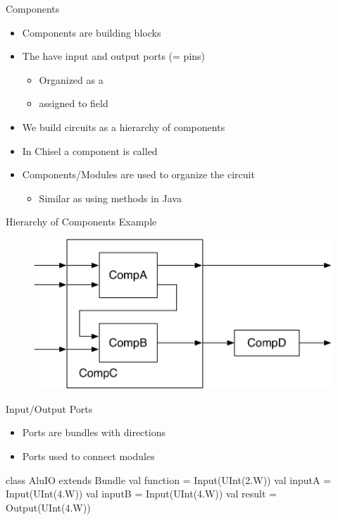 \begin{frame}[fragile]{Components}
\begin{itemize}
\item Components are building blocks
\item The have input and output ports (= pins)
\begin{itemize}
\item Organized as a 
\item assigned to field 
\end{itemize}
\item We build circuits as a hierarchy of components
\item In Chisel a component is called 
\item Components/Modules are used to organize the circuit
\begin{itemize}
\item Similar as using methods in Java
\end{itemize}
\end{itemize}
\end{frame}

\begin{frame}[fragile]{Hierarchy of Components Example}
\begin{figure}
  \includegraphics[scale=\scale]{../figures/components}
\end{figure}
\end{frame}


\begin{frame}[fragile]{Input/Output Ports}
\begin{itemize}
\item Ports are bundles with directions
\item Ports used to connect modules
\end{itemize}
\begin{chisel}
class AluIO extends Bundle {
  val function = Input(UInt(2.W))
  val inputA = Input(UInt(4.W))
  val inputB = Input(UInt(4.W))
  val result = Output(UInt(4.W))
}
\end{chisel}
\end{frame}


